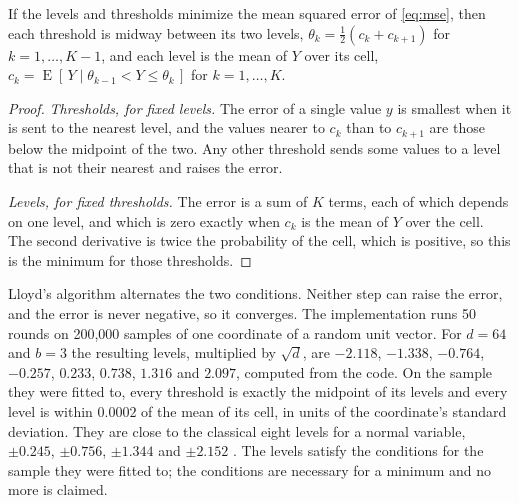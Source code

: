 \begin{proposition}
\label{prop:lloyd}%
If the levels and thresholds minimize the mean squared error of
\cref{eq:mse}, then each threshold is midway between its two levels,
$\theta_k = \tfrac12 (c_k + c_{k+1})$ for $k = 1, \dots, K-1$, and each level
is the mean of $Y$ over its cell,
$c_k = \operatorname{E}[\,Y \mid \theta_{k-1} < Y \le \theta_k\,]$ for
$k = 1, \dots, K$.
\end{proposition}

\begin{proof}
\emph{Thresholds, for fixed levels.} The error of a single value $y$ is
smallest when it is sent to the nearest level, and the values nearer to $c_k$
than to $c_{k+1}$ are those below the midpoint of the two. Any other
threshold sends some values to a level that is not their nearest and raises
the error.

\emph{Levels, for fixed thresholds.} The error is a sum of $K$ terms, each
of which depends on one level, and
which is zero exactly when $c_k$ is the mean of $Y$ over the cell. The second
derivative is twice the probability of the cell, which is positive, so this
is the minimum for those thresholds.
\end{proof}

Lloyd's algorithm alternates the two conditions. Neither step can raise the
error, and the error is never negative, so it converges. The implementation runs
50 rounds on 200,000 samples of one coordinate of a random unit vector. For
$d = 64$ and $b = 3$ the resulting levels, multiplied by $\sqrt d$, are
$-2.118$, $-1.338$, $-0.764$, $-0.257$, $0.233$, $0.738$, $1.316$ and
$2.097$, computed from the code. On the sample they were fitted to, every
threshold is exactly the midpoint of its levels and every level is within
$0.0002$ of the mean of its cell, in units of the coordinate's standard
deviation. They are close to the classical eight levels for a normal
variable, $\pm 0.245$, $\pm 0.756$, $\pm 1.344$ and $\pm 2.152$
\citep{max1960}. The levels satisfy the conditions for the sample they were
fitted to; the conditions are necessary for a minimum and no more is claimed.

